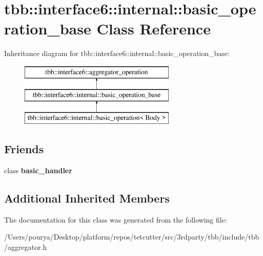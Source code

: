 \hypertarget{classtbb_1_1interface6_1_1internal_1_1basic__operation__base}{}\section{tbb\+:\+:interface6\+:\+:internal\+:\+:basic\+\_\+operation\+\_\+base Class Reference}
\label{classtbb_1_1interface6_1_1internal_1_1basic__operation__base}
Inheritance diagram for tbb\+:\+:interface6\+:\+:internal\+:\+:basic\+\_\+operation\+\_\+base\+:\begin{figure}[H]
\begin{center}
\leavevmode
\includegraphics[height=3.000000cm]{classtbb_1_1interface6_1_1internal_1_1basic__operation__base}
\end{center}
\end{figure}
\subsection*{Friends}
\begin{DoxyCompactItemize}
\item 
\hypertarget{classtbb_1_1interface6_1_1internal_1_1basic__operation__base_afe66260da7455bea5b701a3d8a537ba7}{}class {\bfseries basic\+\_\+handler}\label{classtbb_1_1interface6_1_1internal_1_1basic__operation__base_afe66260da7455bea5b701a3d8a537ba7}

\end{DoxyCompactItemize}
\subsection*{Additional Inherited Members}


The documentation for this class was generated from the following file\+:\begin{DoxyCompactItemize}
\item 
/\+Users/pourya/\+Desktop/platform/repos/tetcutter/src/3rdparty/tbb/include/tbb/aggregator.\+h\end{DoxyCompactItemize}
